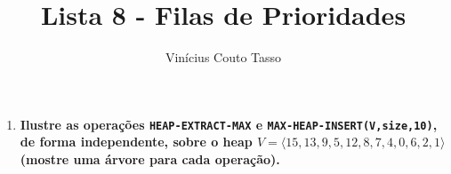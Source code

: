 \documentclass{article}
\title{Lista 8 - Filas de Prioridades}
\author{Vinícius Couto Tasso}
\date{}
\begin{document}
\maketitle
   
         
\begin{enumerate}

\item \textbf{Ilustre as operações \texttt{HEAP-EXTRACT-MAX} e \texttt{MAX-HEAP-INSERT(V,size,10)}, de forma independente, sobre o heap $V = \langle 15, 13, 9, 5, 12, 8, 7, 4, 0, 6, 2, 1 \rangle$ (mostre uma árvore para cada operação).}




\end{enumerate}
\end{document}

